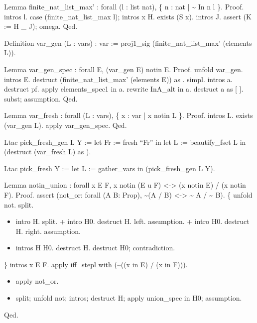Lemma finite\_nat\_list\_max' : forall (l : list nat),
  \{ n : nat | \~{} In n l \}.
Proof.
  intros l. case (finite\_nat\_list\_max l); intros x H.
  exists (S x). intros J. assert (K := H \_ J); omega.
Qed.


Definition var\_gen (L : vars) : var :=
  proj1\_sig (finite\_nat\_list\_max' (elements L)).


Lemma var\_gen\_spec : forall E, (var\_gen E) notin E.
Proof.
  unfold var\_gen. intros E.
  destruct (finite\_nat\_list\_max' (elements E)) as  .
  simpl. intros a. 
  destruct pf.
  apply elements\_spec1 in a.
  rewrite InA\_alt in a.
  destruct a as  [ ].
  subst; assumption.
Qed.


Lemma var\_fresh : forall (L : vars), \{ x : var | x notin L \}.
Proof.
  intros L. exists (var\_gen L). apply var\_gen\_spec.
Qed.


Ltac pick\_fresh\_gen L Y :=
  let Fr := fresh ``Fr'' in
  let L := beautify\_fset L in
  (destruct (var\_fresh L) as  ).


Ltac pick\_fresh Y :=
  let L := gather\_vars in (pick\_fresh\_gen L Y).


Lemma notin\_union : forall x E F,
  x notin (E u F) <-> (x notin E) / (x notin F).
Proof.
assert (not\_or: forall (A B: Prop), \~{}(A / B) <-> \~{} A / \~{} B).
\{
  unfold not.
  split.

\begin{itemize}
\item  intro H.
    split.
    + intro H0.
      destruct H.
      left. 
      assumption.
    + intro H0.
      destruct H.
      right.
      assumption.

\item  intros H H0.
    destruct H.
    destruct H0; contradiction.

\end{itemize}
\}
intros x E F.
apply iff\_stepl with (\~{}((x in E) / (x in F))).

\begin{itemize}
\item  apply not\_or.

\item  split; unfold not; intros; destruct H; apply union\_spec in H0; assumption.

\end{itemize}
Qed.




